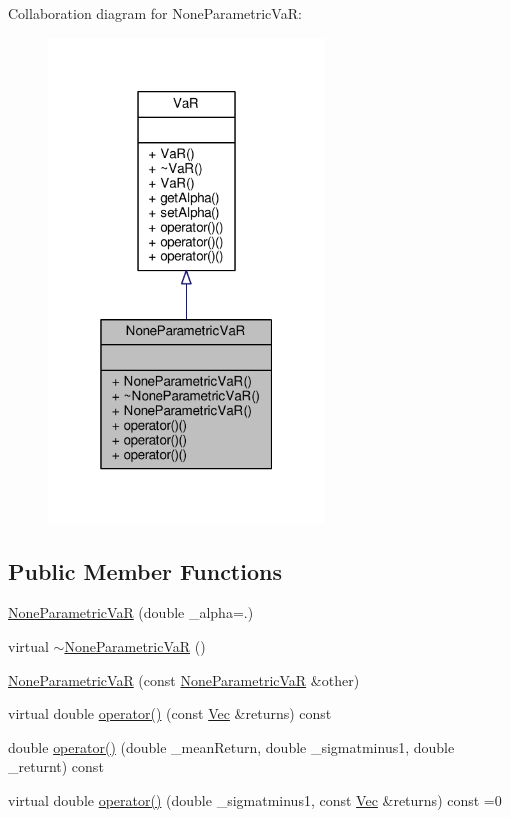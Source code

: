 Collaboration diagram for None\+Parametric\+VaR\+:
\nopagebreak
\begin{figure}[H]
\begin{center}
\leavevmode
\includegraphics[width=208pt]{classNoneParametricVaR__coll__graph}
\end{center}
\end{figure}
\subsection*{Public Member Functions}
\begin{DoxyCompactItemize}
\item 
\hyperlink{classNoneParametricVaR_a0d9d38576c718b01b2ce865e2edaf84e}{None\+Parametric\+VaR} (double \+\_\+alpha=.)
\item 
virtual \hyperlink{classNoneParametricVaR_aac413dea6f621cbe6e1f5037665296c0}{$\sim$\+None\+Parametric\+VaR} ()
\item 
\hyperlink{classNoneParametricVaR_a6aa2553d8ce6b76aed6cb9adf35ca508}{None\+Parametric\+VaR} (const \hyperlink{classNoneParametricVaR}{None\+Parametric\+VaR} \&other)
\item 
virtual double \hyperlink{classNoneParametricVaR_a181d6152dcbdc7ce323e5d4b672a14f8}{operator()} (const \hyperlink{compute__returns__eigen_8h_a1eb6a9306ef406d7975f3cbf2e247777}{Vec} \&returns) const
\item 
double \hyperlink{classNoneParametricVaR_ab22e4237802535880a932097aeaf003b}{operator()} (double \+\_\+mean\+Return, double \+\_\+sigmatminus1, double \+\_\+returnt) const
\item 
virtual double \hyperlink{classNoneParametricVaR_a958aae1b9bc03a8ef87295df30db76f7}{operator()} (double \+\_\+sigmatminus1, const \hyperlink{compute__returns__eigen_8h_a1eb6a9306ef406d7975f3cbf2e247777}{Vec} \&returns) const =0
\end{DoxyCompactItemize}


